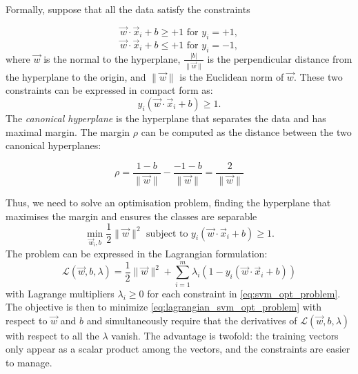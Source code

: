 Formally, suppose that all the data satisfy the constraints

\begin{equation}
\vec{w}\cdot\vec{x}_i + b \geq +1 \text{   for   } y_i = +1,
\end{equation}
\begin{equation}
\vec{w}\cdot\vec{x}_i + b \leq +1 \text{   for   } y_i = -1,
\end{equation}
where $\vec{w}$ is the normal to the hyperplane, $\frac{|b|}{\|\vec{w}\|}$ is the perpendicular distance
from the hyperplane to the origin, and $\|\vec{w}\|$ is the Euclidean norm of $\vec{w}$. These two constraints can be expressed in compact form as:
\begin{equation}
\label{eq:svm_contraint}
y_i( \vec{w}\cdot\vec{x}_i + b)  \geq 1.
\end{equation}
The \textit{canonical hyperplane} is the hyperplane that separates the data and has maximal margin. 
The margin $\rho$ can be computed as the distance
between the two canonical hyperplanes:

\begin{equation}
\label{eq:dinstance_canocical}
\rho = \frac{1 - b}{\|\vec{w}\|} - \frac{- 1 - b}{\|\vec{w}\|} = \frac{2 }{\|\vec{w}\|} 
\end{equation}

Thus, we need to solve an optimisation problem, finding  the hyperplane that maximises the margin and ensures the classes are separable
\begin{equation}
\label{eq:svm_opt_problem}
\min_{\vec{w}_i, b} \frac{1}{2} \|\vec{w}\|^2 \textrm{ subject to } y_i( \vec{w}\cdot\vec{x}_i + b)  \geq 1.
\end{equation}
The problem can be expressed in the Lagrangian formulation:
\begin{equation}
\label{eq:lagrangian_svm_opt_problem}
\mathcal{L}(\vec{w}, b, \lambda) = \frac{1}{2} \|\vec{w}\|^2 + \sum_{i = 1}^{m} \lambda_i(1 -y_i ( \vec{w}\cdot\vec{x}_i + b))
\end{equation}
with Lagrange multipliers $\lambda_i \geq 0$ for each constraint in \ref{eq:svm_opt_problem}. The objective is then to minimize \ref{eq:lagrangian_svm_opt_problem} with respect to $\vec{w}$ and $b$ and simultaneously require that
the derivatives of $\mathcal{L}(\vec{w}, b, \lambda)$ with respect to all the $\lambda$ vanish. The advantage is twofold: the training vectors only appear as a scalar product among the vectors, and the constraints are easier to manage. 

